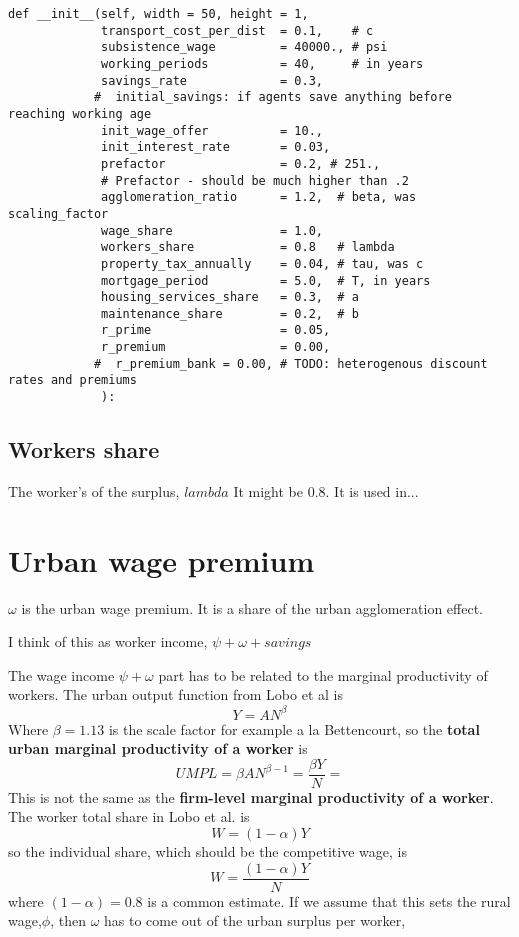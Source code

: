 \begin{lstlisting}
def __init__(self, width = 50, height = 1,
             transport_cost_per_dist  = 0.1,    # c
             subsistence_wage         = 40000., # psi
             working_periods          = 40,     # in years
             savings_rate             = 0.3,
            #  initial_savings: if agents save anything before reaching working age
             init_wage_offer          = 10.,
             init_interest_rate       = 0.03,
             prefactor                = 0.2, # 251., 
             # Prefactor - should be much higher than .2
             agglomeration_ratio      = 1.2,  # beta, was scaling_factor
             wage_share               = 1.0,
             workers_share            = 0.8   # lambda
             property_tax_annually    = 0.04, # tau, was c
             mortgage_period          = 5.0,  # T, in years
             housing_services_share   = 0.3,  # a
             maintenance_share        = 0.2,  # b
             r_prime                  = 0.05,
             r_premium                = 0.00,
            #  r_premium_bank = 0.00, # TODO: heterogenous discount rates and premiums
             ):
\end{lstlisting}

\subsection{Workers share}
The worker's of the surplus, $lambda$ It might be 0.8. It is used in...

\section{Urban wage premium}

$\omega$ is the urban wage premium. It is a share of the urban agglomeration effect. 

I think of this as worker income, $\psi + \omega + savings$ 

The wage income  $\psi + \omega$ part has to be related to the marginal productivity of workers. The urban output function from Lobo et al \cite{loboUrbanScalingProduction2013} is  
\[Y=AN^\beta\]
Where $\beta=1.13$ is the scale factor for example  a la Bettencourt, so the \textbf{total urban marginal productivity of a worker} is  
\[UMPL=\beta AN^{\beta-1}=\frac{\beta Y}{N} =\]
This is not the same as the \textbf{firm-level marginal productivity of a worker}. The worker total share in Lobo et al. is \[W= (1-\alpha)Y \] 
so the individual share, which should be the competitive wage, is
\[W= \frac{(1-\alpha)Y}{N} \] 
where $(1-\alpha)=0.8$ is a common estimate. If we assume that this sets the rural wage,$\phi$, then $\omega$ has to come out of the  urban surplus per worker,

